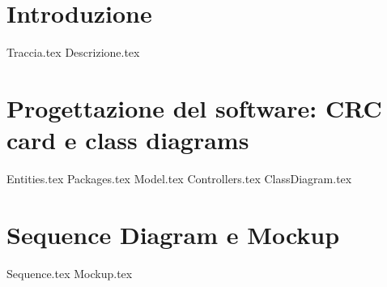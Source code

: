\documentclass[a4paper, oneside, 10pt]{book}
\begin{document}
\chapter{Introduzione}
	{Traccia.tex}
	{Descrizione.tex}
\chapter{Progettazione del software: CRC card e class diagrams}
	{Entities.tex}
	{Packages.tex}
	{Model.tex}
	{Controllers.tex}
	{ClassDiagram.tex}
\chapter{Sequence Diagram e Mockup}
	{Sequence.tex}
	{Mockup.tex}
\end{document}
